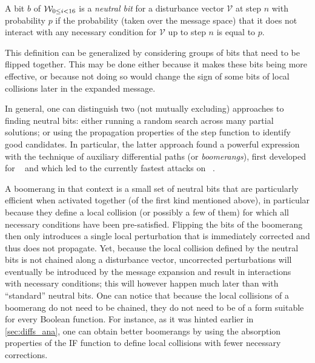 \begin{defi}
A bit $b$ of $\mathcal{W}_{0 \leq i < 16}$ is a \emph{neutral bit} for a disturbance vector $\mathcal{V}$ at step $n$ with probability $p$ if the probability (taken over the message space) that it does not interact
with any necessary condition for $\mathcal{V}$ up to step $n$ is equal to $p$.
\end{defi}

This definition can be generalized by considering groups of bits that need to be flipped together. This may be done either because it makes these bits being more effective, or because not doing so would
change the sign of some bits of local collisions later in the expanded message.

In general, one can distinguish two (not mutually excluding) approaches to finding neutral bits: either running a random search across many partial solutions; or using the propagation properties of the step function to identify
good candidates. In particular, the latter approach found a powerful expression with the technique of auxiliary differential paths (or \emph{boomerangs}), first developed for \shaone~\cite{DBLP:conf/crypto/JouxP07}
and which led to the currently fastest attacks on \shazero~\cite{DBLP:conf/fse/ManuelP08}.

A boomerang in that context is a small set of neutral bits that are particularly efficient when activated together (\ie of the first kind mentioned above), in particular because they define a local collision (or possibly
a few of them) for which all necessary conditions have been pre-satisfied. Flipping the bits of the boomerang then only introduces a single local perturbation that is immediately corrected and thus does not propagate.
Yet, because the local collision defined by the neutral bits is not chained along a disturbance vector, uncorrected perturbations will eventually be introduced by the message expansion and result in interactions
with necessary conditions; this will however happen much later than with ``standard'' neutral bits. One can notice that because the local collisions of a boomerang do not need to be chained, they do not need to
be of a form suitable for every Boolean function. For instance, as it was hinted earlier in \autoref{sec:diffs_ana}, one can obtain better boomerangs by using the absorption properties of the IF function to define
local collisions with fewer necessary corrections.

